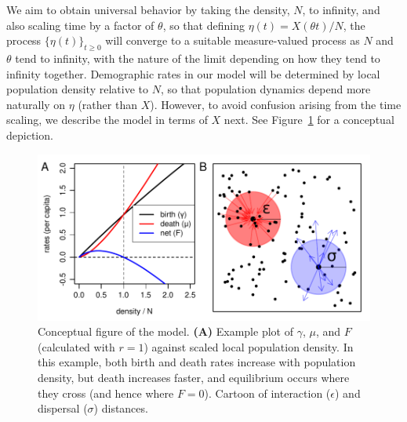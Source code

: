 \documentclass[12pt]{article}
\begin{document}
We aim to obtain universal behavior by taking the density, $N$, to infinity,
and also scaling time by a factor of $\theta$,
so that defining $\eta(t) = X(\theta t) / N$,
the process $\{\eta(t)\}_{t \ge 0}$
will converge to a suitable measure-valued process
as $N$ and $\theta$ tend to infinity,
with the nature of the limit depending on how they tend to infinity together.
Demographic rates in our model
will be determined by local population density relative to $N$,
so that population dynamics depend more naturally on $\eta$ (rather than $X$).
However, to avoid confusion arising from the time scaling,
we describe the model in terms of $X$ next.
See Figure~\ref{fig:model_setup} for a conceptual depiction.

\begin{figure}
    \begin{center}
        \includegraphics{figures/conceptual_figure}
    \end{center}
    \caption{
        Conceptual figure of the model.
        \textbf{(A)} Example plot of $\gamma$, $\mu$, and $F$
        (calculated with $r=1$) against scaled local population density.
        In this example, both birth and death rates increase with population density,
        but death increases faster,
        and equilibrium occurs where they cross
        (and hence where $F=0$).
         Cartoon of interaction ($\epsilon$) and dispersal ($\sigma$) distances.
        \label{fig:model_setup}
    }
\end{figure}
\end{document}
